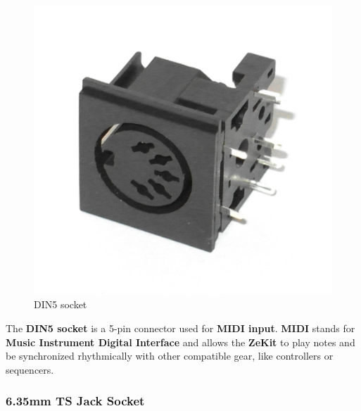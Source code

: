 \documentclass{scrartcl}
\begin{document}
\begin{figure}[!ht]
    \begin{center}
        \includegraphics[scale=0.20]{assets/zekit-din.jpg}
        \caption{DIN5 socket}
    \end{center}
\end{figure}

The \textbf{DIN5 socket} is a 5-pin connector used for \textbf{MIDI input}. \textbf{MIDI} stands for \textbf{Music Instrument Digital Interface} and allows the \textbf{ZeKit} to play notes and be synchronized rhythmically with other compatible gear, like controllers or sequencers.

\subsubsection{6.35mm TS Jack Socket}
\end{document}
